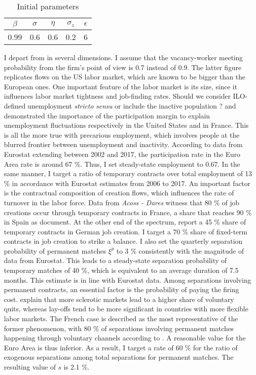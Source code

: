 \documentclass[a4paper]{article}
\begin{document}
\begin{table}[H]
\centering
\begin{tabular}{|c c c c c|}
\hline
$\beta$ & $\sigma$ & $\eta$ & $\sigma_z$ & $\epsilon$\\
\hline
0.99 & 0.6 & 0.6 & 0.2 & 6\\
\hline
\end{tabular}
\caption{Initial parameters \label{parameters}}
\end{table}

I depart from \citet{thomas2009labor} in several dimensions. I assume that the vacancy-worker meeting probability from the firm's point of view is 0.7 instead of 0.9. The latter figure replicates flows on the US labor market, which are known to be bigger than the European ones. One important feature of the labor market is its size, since it influences labor market tightness and job-finding rates. Should we consider ILO-defined unemployment \emph{stricto sensu} or include the inactive population ? \citet{elsby2015importance} and \citet{fontaine2016french} demonstrated the importance of the participation margin to explain unemployment fluctuations respectively in the United States and in France. This is all the more true with precarious employment, which involves people at the blurred frontier between unemployment and inactivity. According to data from Eurostat extending between 2002 and 2017, the participation rate in the Euro Area rate is around 67 \%. Thus, I set steady-state employment to 0.67. In the same manner, I target a ratio of temporary contracts over total employment of 13 \% in accordance with Eurostat estimates from 2006 to 2017. An important factor is the contractual composition of creation flows, which influences the rate of turnover in the labor force. Data from \emph{Acoss - Dares} witness that 80 \% of job creations occur through temporary contracts in France, a share that reaches 90 \% in Spain as \citet{RePEc:fda:fdaeee:eee2017-25} document. At the other end of the spectrum, \citet{addison2019worker} report a 45 \% share of temporary contracts in German job creation. I target a 70 \% share of fixed-term contracts in job creation to strike a balance. I also set the quarterly separation probability of permanent matches $\xi^p$ to 3 \% consistently with the magnitude of data from Eurostat. This leads to a steady-state separation probability of temporary matches of 40 \%, which is equivalent to an average duration of 7.5 months. This estimate is in line with Eurostat data. Among separations involving permanent contracts, an essential factor is the probability of paying the firing cost. \citet{jolivet:hal-00279066} explain that more sclerotic markets lead to a higher share of voluntary quits, whereas lay-offs tend to be more significant in countries with more flexible labor markets. The French case is described as the most representative of the former phenomenon, with 80 \% of separations involving permanent matches happening through voluntary channels according to \citet{dares062018}. A reasonable value for the Euro Area is thus inferior. As a result, I target a rate of 60 \% for the ratio of exogenous separations among total separations for permanent matches. The resulting value of $s$ is 2.1 \%.
\end{document}
